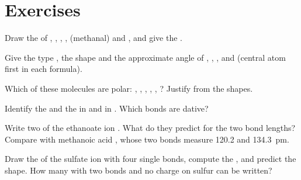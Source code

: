 \section{Exercises}

\begin{exercise}[$\star$]\label{exo:b1:lewis-resonance-vsepr:1}
Draw the  of , , , ,
 (methanal) and , and give the .
\end{exercise}

\begin{exercise}[$\star$]\label{exo:b1:lewis-resonance-vsepr:2}
Give the type , the shape and the approximate angle of
, , ,  and  (central atom
first in each formula).
\end{exercise}

\begin{exercise}[$\star$]\label{exo:b1:lewis-resonance-vsepr:3}
Which of these molecules are polar: , , ,
, , ? Justify from the shapes.
\end{exercise}

\begin{exercise}[$\star$]\label{exo:b1:lewis-resonance-vsepr:4}
Identify the  and the  in  and
in . Which bonds are dative?
\end{exercise}

\begin{exercise}[$\star\star$]\label{exo:b1:lewis-resonance-vsepr:5}
Write two  of the ethanoate ion . What
do they predict for the two  bond lengths? Compare with methanoic
acid , whose two  bonds measure 120.2 and
\qty{134.3}{pm}.
\end{exercise}

\begin{exercise}[$\star\star$]\label{exo:b1:lewis-resonance-vsepr:6}
Draw the  of the sulfate ion  with four
single  bonds, compute the , and predict the
shape. How many  with two  bonds and no
charge on sulfur can be written?
\end{exercise}

